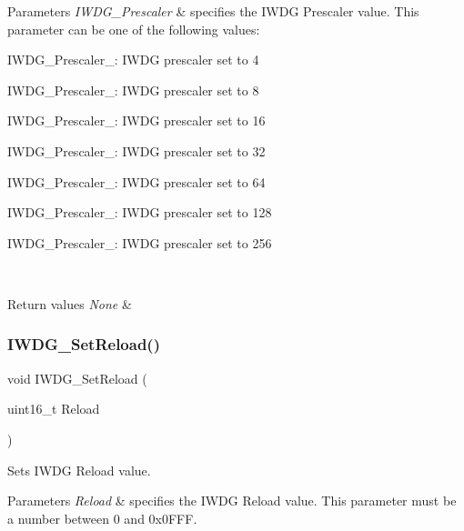 \begin{DoxyParams}{Parameters}
{\em I\+W\+D\+G\+\_\+\+Prescaler} & specifies the I\+W\+DG Prescaler value. This parameter can be one of the following values\+: \begin{DoxyItemize}
\item I\+W\+D\+G\+\_\+\+Prescaler\+\_\+: I\+W\+DG prescaler set to 4 \item I\+W\+D\+G\+\_\+\+Prescaler\+\_\+: I\+W\+DG prescaler set to 8 \item I\+W\+D\+G\+\_\+\+Prescaler\+\_\+: I\+W\+DG prescaler set to 16 \item I\+W\+D\+G\+\_\+\+Prescaler\+\_\+: I\+W\+DG prescaler set to 32 \item I\+W\+D\+G\+\_\+\+Prescaler\+\_\+: I\+W\+DG prescaler set to 64 \item I\+W\+D\+G\+\_\+\+Prescaler\+\_\+: I\+W\+DG prescaler set to 128 \item I\+W\+D\+G\+\_\+\+Prescaler\+\_\+: I\+W\+DG prescaler set to 256 \end{DoxyItemize}
\\
\hline
\end{DoxyParams}

\begin{DoxyRetVals}{Return values}
{\em None} & \\
\hline
\end{DoxyRetVals}
\mbox{\label{group___i_w_d_g___exported___functions_gae2a14752a0431f23cb80cebf202ac365}} 
\subsubsection{\texorpdfstring{IWDG\_SetReload()}{IWDG\_SetReload()}}
{\footnotesize\ttfamily void I\+W\+D\+G\+\_\+\+Set\+Reload (\begin{DoxyParamCaption}\item[{uint16\+\_\+t}]{Reload }\end{DoxyParamCaption})}



Sets I\+W\+DG Reload value. 


\begin{DoxyParams}{Parameters}
{\em Reload} & specifies the I\+W\+DG Reload value. This parameter must be a number between 0 and 0x0\+F\+FF. \\
\hline
\end{DoxyParams}

